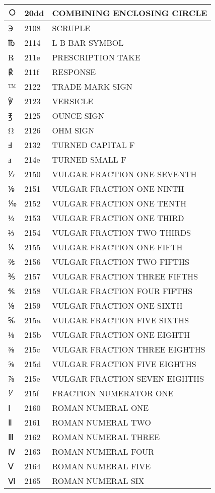 \documentclass[12pt,letterpaper,openany]{book}
\begin{document}
\begin{center}
\begin{supertabular}{|m{0.25in}|m{0.5in}|m{4in}|}
⃝ & 20dd & COMBINING ENCLOSING CIRCLE\\\hline
℈ & 2108 & SCRUPLE\\\hline
℔ & 2114 & L B BAR SYMBOL\\\hline
℞ & 211e & PRESCRIPTION TAKE\\\hline
℟ & 211f & RESPONSE\\\hline
™ & 2122 & TRADE MARK SIGN\\\hline
℣ & 2123 & VERSICLE\\\hline
℥ & 2125 & OUNCE SIGN\\\hline
Ω & 2126 & OHM SIGN\\\hline
Ⅎ & 2132 & TURNED CAPITAL F\\\hline
ⅎ & 214e & TURNED SMALL F\\\hline
⅐ & 2150 & VULGAR FRACTION ONE SEVENTH\\\hline
⅑ & 2151 & VULGAR FRACTION ONE NINTH\\\hline
⅒ & 2152 & VULGAR FRACTION ONE TENTH\\\hline
⅓ & 2153 & VULGAR FRACTION ONE THIRD\\\hline
⅔ & 2154 & VULGAR FRACTION TWO THIRDS\\\hline
⅕ & 2155 & VULGAR FRACTION ONE FIFTH\\\hline
⅖ & 2156 & VULGAR FRACTION TWO FIFTHS\\\hline
⅗ & 2157 & VULGAR FRACTION THREE FIFTHS\\\hline
⅘ & 2158 & VULGAR FRACTION FOUR FIFTHS\\\hline
⅙ & 2159 & VULGAR FRACTION ONE SIXTH\\\hline
⅚ & 215a & VULGAR FRACTION FIVE SIXTHS\\\hline
⅛ & 215b & VULGAR FRACTION ONE EIGHTH\\\hline
⅜ & 215c & VULGAR FRACTION THREE EIGHTHS\\\hline
⅝ & 215d & VULGAR FRACTION FIVE EIGHTHS\\\hline
⅞ & 215e & VULGAR FRACTION SEVEN EIGHTHS\\\hline
⅟ & 215f & FRACTION NUMERATOR ONE\\\hline
Ⅰ & 2160 & ROMAN NUMERAL ONE\\\hline
Ⅱ & 2161 & ROMAN NUMERAL TWO\\\hline
Ⅲ & 2162 & ROMAN NUMERAL THREE\\\hline
Ⅳ & 2163 & ROMAN NUMERAL FOUR\\\hline
Ⅴ & 2164 & ROMAN NUMERAL FIVE\\\hline
Ⅵ & 2165 & ROMAN NUMERAL SIX\\\hline

\end{supertabular}
\end{center}
\end{document}
